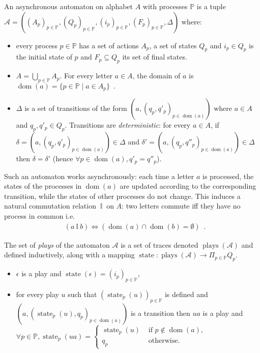 \documentclass[a4paper,UKenglish]{lipics-v2016}
\newcommand{\PP}{\mathbb{P}}
\renewcommand{\AA}{\mathcal{A}}
\newcommand{\ind}{~\mathbb{I}~}
\DeclareMathOperator{\dom}{dom}
\DeclareMathOperator{\plays}{plays}
\DeclareMathOperator{\state}{state}
\begin{document}
\begin{definition}
An asynchronous automaton on alphabet $A$ with processes $\PP$ is a tuple
$
\mathcal{A} = ((A_p)_{p\in \PP},(Q_p)_{p\in \PP},  (i_p)_{p\in \PP},(F_p)_{p\in \PP}, \Delta)
$
where:
\begin{itemize}
\item
 every process $p\in \PP$ has a set of actions
 $A_p$, a set of states $Q_p$
 and $i_p\in Q_p$ is the initial state of $p$ and $F_p\subseteq Q_p$ its set of final states.
\item
 $A=\bigcup_{p\in \PP} A_p$.
 For every letter $a\in A$, the domain of $a$ is 
 $
 \dom(a)=\{p\in \PP\mid a\in A_p\}\enspace.
$
 \item
$\Delta$ is a set of transitions of the form 
$(a,(q_p,q'_p)_{p\in\dom(a)})$
where $a\in A$
and $q_p,q'_p\in Q_p$.
Transitions are \emph{deterministic}: for every $a\in A$,
if
$\delta=(a,(q_p,q'_p)_{p\in \dom(a)})\in \Delta$
and $\delta'=(a,(q_p,q''_p)_{p\in \dom(a)})\in \Delta$
then $\delta=\delta'$
(hence 
 $\forall p \in \dom(a),q'_p=q''_p$).
\end{itemize}
\end{definition}

Such an automaton works asynchronously:
each time a letter $a$ is processed, the states of the processes
in $\dom(a)$ are updated according to the corresponding
transition, while the states of other processes do not change.
This induces a natural commutation relation $\ind$ on $A$:
two letters commute iff they have no process in common i.e.
\begin{align*}
& (a \ind b) \iff (\dom(a)\cap \dom(b) = \emptyset)\enspace.
\end{align*}

The set of \emph{plays} of the automaton $\AA$
is a set of traces denoted $\plays(\AA)$ and defined inductively, along with 
a mapping $\state:\plays(\AA) \to \Pi_{p\in\PP}Q_p$.
\begin{itemize}
\item $\epsilon$ is a play and $\state(\epsilon)=(i_p)_{p\in \PP}$,
\item for every play $u$ such that $(\state_p(u))_{p\in\PP}$ is defined
and $\left(a,(\state_p(u),q_p)_{p\in\dom(a)}\right)$
is a transition then
$ua$ is a play and
$
\forall p \in \PP,
\state_p(ua) =
\begin{cases}
\state_p(u) &\text{ if $p\not\in\dom(a)$,}\\
q_p &\text{ otherwise.}
\end{cases}
$
\end{itemize}
\end{document}

